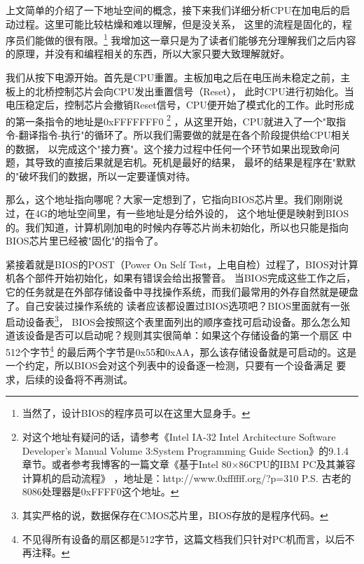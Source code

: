 \par 上文简单的介绍了一下地址空间的概念，接下来我们详细分析CPU在加电后的启动过程。这里可能比较枯燥和难以理解，但是没关系，\allowbreak
这里的流程是固化的，程序员们能做的很有限。\footnote{当然了，设计BIOS的程序员可以在这里大显身手。}\allowbreak
我增加这一章只是为了读者们能够充分理解我们之后内容的原理，并没有和编程相关的东西，所以大家只要大致理解就好。

\par 我们从按下电源开始。首先是CPU重置。主板加电之后在电压尚未稳定之前，主板上的北桥控制芯片会向CPU发出重置信号（Reset），\allowbreak
此时CPU进行初始化。当电压稳定后，控制芯片会撤销Reset信号，CPU便开始了模式化的工作。此时形成的第一条指令的地址是0xFFFFFFF0\allowbreak
\footnote{对这个地址有疑问的话，请参考《Intel IA-32 Intel Architecture Software Developer’s Manual Volume 3:System \allowbreak
Programming Guide Section》的9.1.4 章节。或者参考我博客的一篇文章《基于Intel 80×86CPU的IBM PC及其兼容计算机的启动流程》\allowbreak
，地址是：http://www.0xffffff.org/?p=310 P.S. 古老的8086处理器是0xFFFF0这个地址。}\allowbreak
，从这里开始，CPU就进入了一个"取指令-翻译指令-执行"的循环了。所以我们需要做的就是在各个阶段提供给CPU相关的数据，\allowbreak
以完成这个"接力赛"。这个接力过程中任何一个环节如果出现致命问题，其导致的直接后果就是宕机。死机是最好的结果，\allowbreak
最坏的结果是程序在"默默的"破坏我们的数据，所以一定要谨慎对待。

\par 那么，这个地址指向哪呢？大家一定想到了，它指向BIOS芯片里。我们刚刚说过，在4G的地址空间里，有一些地址是分给外设的，\allowbreak
这个地址便是映射到BIOS的。我们知道，计算机刚加电的时候内存等芯片尚未初始化，所以也只能是指向BIOS芯片里已经被"固化"的指令了。\allowbreak

\par 紧接着就是BIOS的POST（Power On Self Test，上电自检）过程了，BIOS对计算机各个部件开始初始化，如果有错误会给出报警音。\allowbreak
当BIOS完成这些工作之后，它的任务就是在外部存储设备中寻找操作系统，而我们最常用的外存自然就是硬盘了。自己安装过操作系统的\allowbreak
读者应该都设置过BIOS选项吧？BIOS里面就有一张启动设备表\footnote{其实严格的说，数据保存在CMOS芯片里，BIOS存放的是程序代码。}，\allowbreak
BIOS会按照这个表里面列出的顺序查找可启动设备。那么怎么知道该设备是否可以启动呢？规则其实很简单：如果这个存储设备的第一个扇区\allowbreak
中512个字节\footnote{不见得所有设备的扇区都是512字节，这篇文档我们只针对PC机而言，以后不再注释。}\allowbreak
的最后两个字节是0x55和0xAA，那么该存储设备就是可启动的。这是一个约定，所以BIOS会对这个列表中的设备逐一检测，只要有一个设备满足\allowbreak
要求，后续的设备将不再测试。

